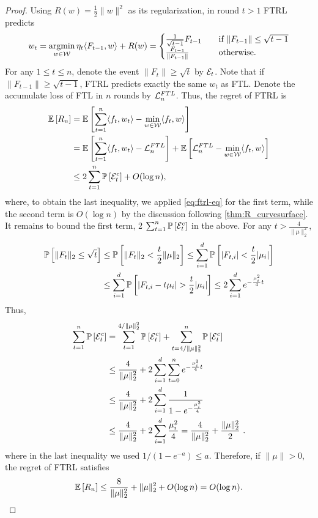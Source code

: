 \begin{proof}
	Using $R(w) = \frac{1}{2}\|w\|^2$ as its regularization, in round $t>1$ FTRL predicts 
	\begin{equation}
	\label{eq:ftrl-eq}
	w_{t} = \operatorname*{argmin}_{w\in \mathcal{W}} \eta_t \langle F_{t-1}, w\rangle + R(w) = 
	\begin{cases}
	\frac{1}{\sqrt{t-1}} F_{t-1} & \quad \text{if  } \|F_{t-1}\| \le \sqrt{t-1} \\
	\frac{F_{t-1}}{\|F_{t-1}\|} & \quad \text{otherwise.} 
	\end{cases}
	\end{equation}
	For any $1\le t \le n$,  denote the event $\|F_t\| \ge \sqrt{t}$ by $\mathcal{E}_t$. Note that if $\|F_{t-1}\| \ge \sqrt{t-1}$, FTRL predicts exactly the same $w_t$ as FTL. Denote the accumulate loss of FTL in $n$ rounds by $\mathcal{L}^{FTL}_n$. Thus, the regret of FTRL is
	\begin{align*}
	\mathbb{E}\left[ R_n \right] & = \mathbb{E}\left[ \sum_{t=1}^{n} \langle f_t, w_t\rangle - \min_{w\in\mathcal{W}}  \langle f_t, w\rangle \right] \\
	& = \mathbb{E}\left[  \sum_{t=1}^{n} \langle f_t, w_t\rangle - \mathcal{L}^{FTL}_n  \right]+ \mathbb{E}\left[ \mathcal{L}^{FTL}_n - \min_{w\in\mathcal{W}} \langle f_t, w\rangle  \right] \\
	& \le 2 \sum_{t=1}^{n} \mathbb{P}\left[\mathcal{E}_t^c\right] + O(\log n),
	\end{align*}
	where, to obtain the last inequality, we applied \eqref{eq:ftrl-eq} for the first term, while the second term is $O(\log n)$ by the discussion following \cref{thm:R_curvesurface}.
	It remains to bound the first term, 2 $\sum_{t=1}^{n} \mathbb{P}\left[\mathcal{E}_t^c\right] $ in the above.
	For any $t > \frac{4}{\|\mu\|_2^2}$,
	\begin{align*}
	\mathbb{P}\left[ \|F_{t}\|_2 \le \sqrt{t} \right] &\le \mathbb{P}\left[ \|F_{t}\|_2 <  \frac{t}{2}\|\mu\|_2 \right] \le \sum_{i=1}^d \mathbb{P}\left[|F_{t,i}| < \frac{t}{2} |\mu_i|\right] \\
	             &\le \sum_{i=1}^d \mathbb{P}\left[|F_{t,i}-t\mu_i| >  \frac{t}{2} |\mu_i|\right] \le 2 \sum_{i=1}^d e^{-\frac{\mu_i^2}{4} t}
	\end{align*}
	Thus,
	\begin{align*}
	\sum_{t=1}^{n} \mathbb{P}\left[\mathcal{E}_t^c\right]  & = \sum_{t=1}^{4/\|\mu\|_2^2} \mathbb{P}\left[\mathcal{E}_t^c\right]  + \sum_{t=4/\|\mu\|_2^2}^{n} \mathbb{P}\left[\mathcal{E}_t^c\right] \\
	& \le \frac{4}{\|\mu\|_2^2} + 2\sum_{i=1}^d \sum_{t=0}^{n} e^{-\frac{\mu_i^2}{4} t} \\
	& \le \frac{4}{\|\mu\|_2^2} + 2\sum_{i=1}^d \frac{1}{1-e^{ -\frac{\mu_i^2}{4}}} \\
	& \le  \frac{4}{\|\mu\|_2^2} + 2\sum_{i=1}^d \frac{\mu_i^2}{4} = \frac{4}{\|\mu\|_2^2}  + \frac{\|\mu\|_2^2}{2}~.
	\end{align*}
	where in the last inequality we used $1/(1-e^{-a}) \le a$.
	Therefore, if $\|\mu\| > 0$, the regret of FTRL satisfies
	\[
	\mathbb{E}\left[ R_n \right] \le \frac{8}{\|\mu\|_2^2} + \|\mu\|_2^2 + O(\log n) = O(\log n).
	\]
\end{proof}

